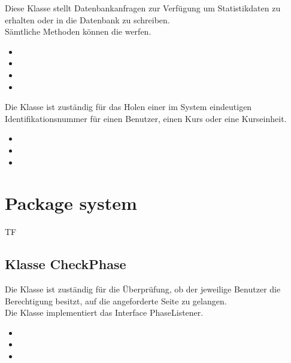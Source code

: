 	Diese Klasse stellt Datenbankanfragen zur Verfügung um Statistikdaten zu erhalten oder in die Datenbank
	zu schreiben.\\
	Sämtliche Methoden können die  werfen.
	\begin{itemize}
		\item {}
		\item {}
		\item {}
		\item {}
	\end{itemize}
	
	Die Klasse ist zuständig für das Holen einer im System eindeutigen Identifikationsnummer für einen Benutzer, einen Kurs oder eine Kurseinheit.
	\begin{itemize}
		\item {}
		\item {}
		\item {}
	\end{itemize}
	
	
	\section{Package system}
	\begin{tiny}
		TF
	\end{tiny}
	\subsection{Klasse CheckPhase}
	Die Klasse ist zuständig für die Überprüfung, ob der jeweilige Benutzer die Berechtigung besitzt, auf die angeforderte Seite zu gelangen.\\
	Die Klasse implementiert das Interface PhaseListener.
	\begin{itemize}
		\item {}
		\item \override
		\item \override
	\end{itemize}
	
